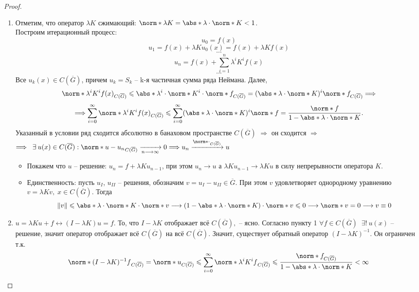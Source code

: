 \begin{proof}
  \begin{enumerate} 
  	\item Отметим, что оператор $\lambda K$ сжимающий: $\norm*{\lambda K} = \abs*{\lambda}\cdot\norm*{K} < 1$. \\Построим итерационный процесс:
    $$u_{0} = f(x)$$
    $$u_{1} = f(x) + \lambda K u_{0}(x) = f(x) + \lambda K f(x)$$
    $$\cdots$$
    $$u_{n} = f(x) + \sum_{i=1}^{n}\lambda^{i}K^{i}f(x)$$
    $$\cdots$$
    Все $u_{k}(x) \in C(\overline{G})$, причем $u_{k} = S_{k}$ -- k-я частичная сумма ряда Неймана.
    Далее, $$\norm*{\lambda^{i}K^{i}f(x)}_{C(\overline{G})} \leq \abs*{\lambda^{i}}\cdot\norm*{K}^{i}\cdot\norm*{f}_{C(\overline{G})}=(\abs*{\lambda}\cdot\norm*{K})^{i}\norm*{f}_{C(\overline{G})}\Longrightarrow$$ 
    $$\Longrightarrow \sum_{i=0}^{\infty}\norm*{\lambda^{i}K^{i}f(x)}_{C(\overline{G})} \leq \sum_{i=0}^{\infty}(\abs*{\lambda}\cdot\norm*{K})^{i}\norm*{f} = \frac{\norm*{f}}{1 - \abs*{\lambda}\cdot\norm*{K}}.$$
    Указанный в условии ряд сходится абсолютно в банаховом пространстве $C(\overline{G})$ $\Longrightarrow$ он сходится $\Longrightarrow$ \\ $\Longrightarrow \Exists u(x) \in C(\overline{G}): \norm*{u - u_{n}}_{C(\overline{G})} \xrightarrow[n \longrightarrow \infty]{} 0 \Longrightarrow u_{n} \xrightarrow{\norm*{\cdot}_{C(\overline{G})}} u$
    \begin{itemize}
	  \item Покажем что $u$ -- решение: $u_{n} = f + \lambda K u_{n-1}$, при этом $u_{n} \longrightarrow u$ а $\lambda K u_{n-1} \longrightarrow \lambda K u$ в силу непрерывности оператора $K$.
      \item Единственность: пусть $u_{I}$, $u_{II}$ -- решения, обозначим $v = u_{I} - u_{II} \in \overline{G}$. При этом $v$ удовлетворяет однородному уравнению $v = \lambda K v, \; x \in C(\overline{G})$. Тогда $$\|v\| \leq \abs*{\lambda}\cdot\norm*{K}\cdot\norm*{v} \longrightarrow (1 - \abs*{\lambda}\cdot\norm*{K})\cdot\norm*{v} \leq 0 \longrightarrow \norm*{v} = 0 \longrightarrow v \equiv 0$$
	\end{itemize}
    \item $u = \lambda Ku + f \longleftrightarrow (I - \lambda  K)u = f$. То, что $I - \lambda K$ отображает всё $C(\overline{G}),$ -- ясно. Согласно пункту 1 $\forall f \in C(\overline{G}) \;\;\exists!\ u(x)$ -- решение, значит оператор отображает всё $C(\overline{G})$ на всё $C(\overline{G})$. Значит, существует обратный оператор $(I - \lambda K)^{-1}$. Он ограничен т.к. $$\norm*{(I - \lambda K)^{-1}f}_{C(\overline{G})} = \norm*{u}_{C(\overline{G})} \leq \sum_{i = 0}^{\infty}\norm*{\lambda^{i}K^{i}f}_{C(\overline{G})} \leq \frac{\norm*{f}_{C(\overline{G})}}{1 - \abs*{\lambda}\cdot\norm*{K}} < \infty$$
  \end{enumerate}
\end{proof}
